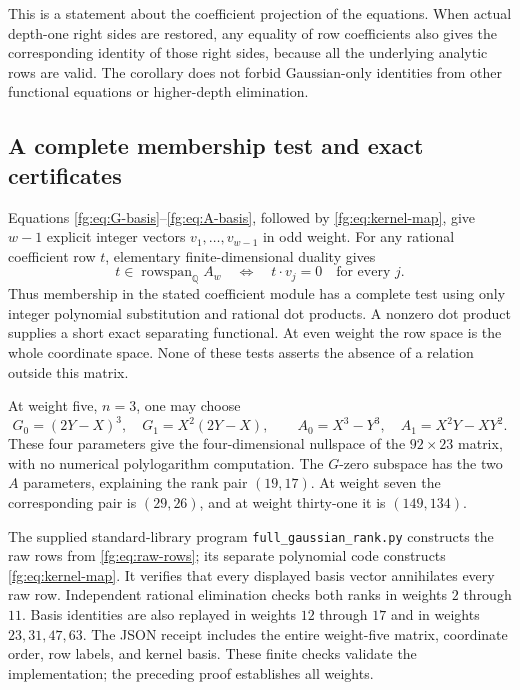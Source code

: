 This is a statement about the coefficient projection of the equations.
When actual depth-one right sides are restored, any equality of row
coefficients also gives the corresponding identity of those right
sides, because all the underlying analytic rows are valid. The
corollary does not forbid Gaussian-only identities from other
functional equations or higher-depth elimination.

\subsection{A complete membership test and exact certificates}

Equations \eqref{fg:eq:G-basis}--\eqref{fg:eq:A-basis}, followed by
\eqref{fg:eq:kernel-map}, give $w-1$ explicit integer vectors
$v_1,\ldots,v_{w-1}$ in odd weight. For any rational coefficient row
$t$, elementary finite-dimensional duality gives
\begin{equation}\label{fg:eq:membership}
 t\in\operatorname{rowspan}_{\mathbb Q}A_w
 \quad\Longleftrightarrow\quad
 t\cdot v_j=0\quad\text{for every }j.
\end{equation}
Thus membership in the stated coefficient module has a complete test
using only integer polynomial substitution and rational dot products.
A nonzero dot product supplies a short exact separating functional.
At even weight the row space is the whole coordinate space. None of
these tests asserts the absence of a relation outside this matrix.

At weight five, $n=3$, one may choose
\[
 G_0=(2Y-X)^3,\quad G_1=X^2(2Y-X),\qquad
 A_0=X^3-Y^3,\quad A_1=X^2Y-XY^2.
\]
These four parameters give the four-dimensional nullspace of the
$92\times23$ matrix, with no numerical polylogarithm computation.
The $G$-zero subspace has the two $A$ parameters, explaining the
rank pair $(19,17)$. At weight seven the corresponding pair is
$(29,26)$, and at weight thirty-one it is $(149,134)$.

The supplied standard-library program
\texttt{full\_gaussian\_rank.py} constructs the raw rows from
\eqref{fg:eq:raw-rows}; its separate polynomial code constructs
\eqref{fg:eq:kernel-map}. It verifies that every displayed basis
vector annihilates every raw row. Independent rational elimination
checks both ranks in weights $2$ through $11$. Basis identities are
also replayed in weights $12$ through $17$ and in weights
$23,31,47,63$. The JSON receipt includes the entire weight-five
matrix, coordinate order, row labels, and kernel basis. These finite
checks validate the implementation; the preceding proof establishes
all weights.

